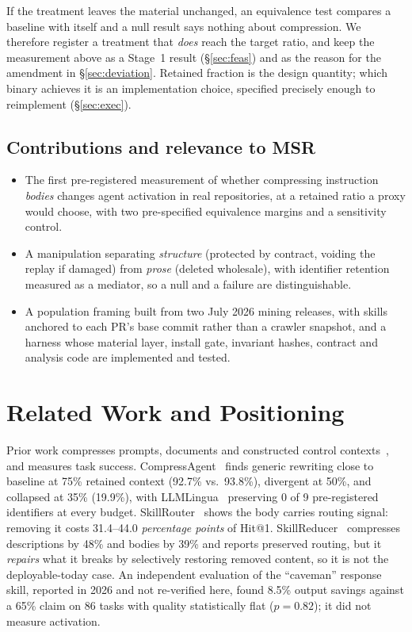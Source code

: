 \documentclass[10pt,conference]{IEEEtran}
\begin{document}
If the treatment leaves the material unchanged, an equivalence test compares a baseline with itself and a null result says nothing about compression. We therefore register a treatment that \emph{does} reach the target ratio, and keep the measurement above as a Stage~1 result (\S\ref{sec:feas}) and as the reason for the amendment in \S\ref{sec:deviation}. Retained fraction is the design quantity; which binary achieves it is an implementation choice, specified precisely enough to reimplement (\S\ref{sec:exec}).

\subsection{Contributions and relevance to MSR}
\begin{itemize}
\item The first pre-registered measurement of whether compressing instruction \emph{bodies} changes agent activation in real repositories, at a retained ratio a proxy would choose, with two pre-specified equivalence margins and a sensitivity control.
\item A manipulation separating \emph{structure} (protected by contract, voiding the replay if damaged) from \emph{prose} (deleted wholesale), with identifier retention measured as a mediator, so a null and a failure are distinguishable.
\item A population framing built from two July 2026 mining releases, with skills anchored to each PR's base commit rather than a crawler snapshot, and a harness whose material layer, install gate, invariant hashes, contract and analysis code are implemented and tested.
\end{itemize}

\section{Related Work and Positioning}
\label{sec:related}
Prior work compresses prompts, documents and constructed control contexts~\cite{survey}, and measures task success. CompressAgent~\cite{compressagent} finds generic rewriting close to baseline at 75\% retained context (92.7\% vs.\ 93.8\%), divergent at 50\%, and collapsed at 35\% (19.9\%), with LLMLingua~\cite{llmlingua} preserving 0 of 9 pre-registered identifiers at every budget. SkillRouter~\cite{skillrouter} shows the body carries routing signal: removing it costs 31.4--44.0 \emph{percentage points} of Hit@1. SkillReducer~\cite{skillreducer} compresses descriptions by 48\% and bodies by 39\% and reports preserved routing, but it \emph{repairs} what it breaks by selectively restoring removed content, so it is not the deployable-today case. An independent evaluation of the ``caveman'' response skill, reported in 2026 and not re-verified here, found 8.5\% output savings against a 65\% claim on 86 tasks with quality statistically flat ($p=0.82$); it did not measure activation.
\end{document}

